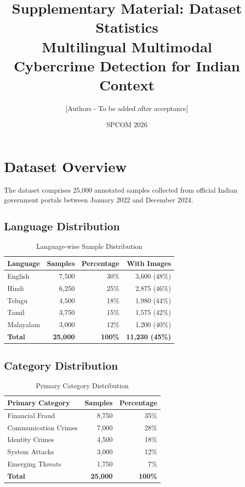 \documentclass[10pt,a4paper]{article}
\title{Supplementary Material: Dataset Statistics\\
\large Multilingual Multimodal Cybercrime Detection for Indian Context}
\author{[Authors - To be added after acceptance]}
\date{SPCOM 2026}
\begin{document}
\maketitle

\section{Dataset Overview}

The dataset comprises 25,000 annotated samples collected from official Indian government portals between January 2022 and December 2024.

\subsection{Language Distribution}

\begin{table}[h]
\centering
\caption{Language-wise Sample Distribution}
\begin{tabular}{lrrr}
\toprule
\rowcolor{headerblue}
\textbf{Language} & \textbf{Samples} & \textbf{Percentage} & \textbf{With Images} \\
\midrule
English   & 7,500  & 30\% & 3,600 (48\%) \\
Hindi     & 6,250  & 25\% & 2,875 (46\%) \\
Telugu    & 4,500  & 18\% & 1,980 (44\%) \\
Tamil     & 3,750  & 15\% & 1,575 (42\%) \\
Malayalam & 3,000  & 12\% & 1,200 (40\%) \\
\midrule
\textbf{Total} & \textbf{25,000} & \textbf{100\%} & \textbf{11,230 (45\%)} \\
\bottomrule
\end{tabular}
\end{table}

\subsection{Category Distribution}

\begin{table}[h]
\centering
\caption{Primary Category Distribution}
\begin{tabular}{lrr}
\toprule
\rowcolor{headerblue}
\textbf{Primary Category} & \textbf{Samples} & \textbf{Percentage} \\
\midrule
Financial Fraud           & 8,750  & 35\% \\
Communication Crimes      & 7,000  & 28\% \\
Identity Crimes           & 4,500  & 18\% \\
System Attacks            & 3,000  & 12\% \\
Emerging Threats          & 1,750  &  7\% \\
\midrule
\textbf{Total}            & \textbf{25,000} & \textbf{100\%} \\
\bottomrule
\end{tabular}
\end{table}
\end{document}
